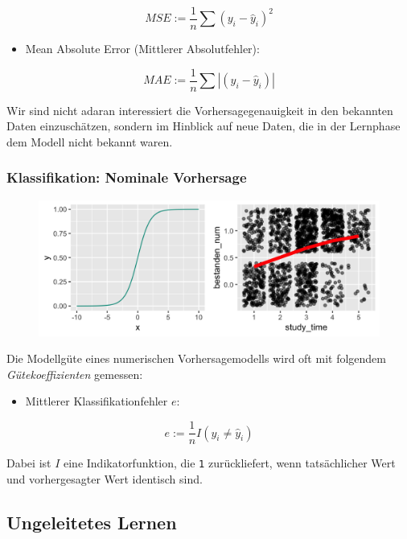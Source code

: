 \documentclass[
]{book}
\providecommand{\tightlist}{%
  \setlength{\itemsep}{0pt}\setlength{\parskip}{0pt}}
\begin{document}
\[MSE := \frac{1}{n} \sum (y_i - \hat{y}_i)^2\]

\begin{itemize}
\tightlist
\item
  Mean Absolute Error (Mittlerer Absolutfehler):
\end{itemize}

\[MAE :=  \frac{1}{n} \sum |(y_i - \hat{y}_i)|\]

Wir sind nicht adaran interessiert die Vorhersagegenauigkeit in den bekannten Daten einzuschätzen, sondern im Hinblick auf neue Daten, die in der Lernphase dem Modell nicht bekannt waren.

\hypertarget{klassifikation-nominale-vorhersage}{%
\subsubsection{Klassifikation: Nominale Vorhersage}\label{klassifikation-nominale-vorhersage}}

\begin{figure}[H]

{\centering \includegraphics[width=0.7\linewidth]{img/aktien-plot-1} 

}

\end{figure}

Die Modellgüte eines numerischen Vorhersagemodells wird oft mit folgendem \emph{Gütekoeffizienten} gemessen:

\begin{itemize}
\tightlist
\item
  Mittlerer Klassifikationfehler \(e\):
\end{itemize}

\[e := \frac{1}{n} I(y_i \ne \hat{y}_i) \]

Dabei ist \(I\) eine Indikatorfunktion, die \texttt{1} zurückliefert,
wenn tatsächlicher Wert und vorhergesagter Wert identisch sind.

\hypertarget{ungeleitetes-lernen}{%
\subsection{Ungeleitetes Lernen}\label{ungeleitetes-lernen}}
\end{document}
